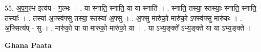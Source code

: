 \documentclass[17pt]{extarticle}
\begin{document}
55. अ॒प॒ग॒ल्भ इत्य॑प - ग॒ल्भः । . या स्नाति॒ स्नाति॒ या या स्नाति॑ । . स्नाति॒ तस्या॒ स्तस्याः॒ स्नाति॒ स्नाति॒ तस्याः᳚ । . तस्या॑ अ॒फ्स्व॑फ्सु तस्या॒ स्तस्या॑ अ॒फ्सु । . अ॒फ्सु मारु॑को॒ मारु॑को॒ ऽफ्स्व॑फ्सु मारु॑कः । . अ॒फ्सित्य॑प् - सु । . मारु॑को॒ या या मारु॑को॒ मारु॑को॒ या । . या ऽभ्य॒ङ्क्ते᳚ ऽभ्य॒ङ्क्ते या या ऽभ्य॒ङ्क्ते । \newline

\textbf{Ghana Paata } \newline
\end{document}
